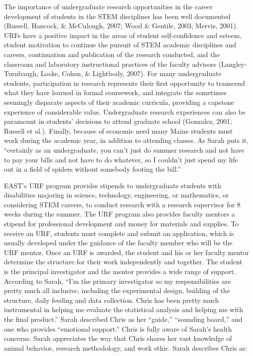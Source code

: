 \documentclass[11.5pt]{sig-alternate} %
\begin{document}
\begin{large}
The importance of undergraduate research opportunities in the career development of students in the STEM disciplines has been well documented (Russell, Hancock, \& McCulough, 2007; Wood \& Gentile, 2003; Mervis, 2001). URFs have a positive impact in the areas of student self-confidence and esteem, student motivation to continue the pursuit of STEM academic disciplines and careers, continuation and publication of the research conducted, and the classroom and laboratory instructional practices of the faculty advisors (Langley-Turnbaugh, Locke, Cohen, \& Lightbody, 2007). For many undergraduate students, participation in research represents their first opportunity to transcend what they have learned in formal coursework, and integrate the sometimes seemingly disparate aspects of their academic curricula, providing a capstone experience of considerable value. Undergraduate research experiences can also be paramount in students' decisions to attend graduate school (Gonzalez, 2001; Russell et al.). Finally, because of economic need many Maine students must work during the academic year, in addition to attending classes. As Sarah puts it, “certainly as an undergraduate, you can't just do summer research and not have to pay your bills and not have to do whatever, so I couldn't just spend my life out in a field of spiders without somebody footing the bill.”

EAST's URF program provides stipends to undergraduate students with disabilities majoring in science, technology, engineering, or mathematics, or considering STEM careers, to conduct research with a research supervisor for 8 weeks during the summer. The URF program also provides faculty mentors a stipend for professional development and money for materials and supplies. To receive an URF, students must complete and submit an application, which is usually developed under the guidance of the faculty member who will be the URF mentor. Once an URF is awarded, the student and his or her faculty mentor determine the structure for their work independently and together. The student is the principal investigator and the mentor provides a wide range of support. According to Sarah, “I'm the primary investigator so my responsibilities are pretty much all inclusive, including the experimental design, building of the structure, daily feeding and data collection. Chris has been pretty much instrumental in helping me evaluate the statistical analysis and helping me with the final product.” Sarah described Chris as her “guide,” “sounding board,” and one who provides “emotional support.” Chris is fully aware of Sarah's health concerns. Sarah appreciates the way that Chris shares her vast knowledge of animal behavior, research methodology, and work ethic. Sarah describes Chris as:


\end{large}
\end{document}
